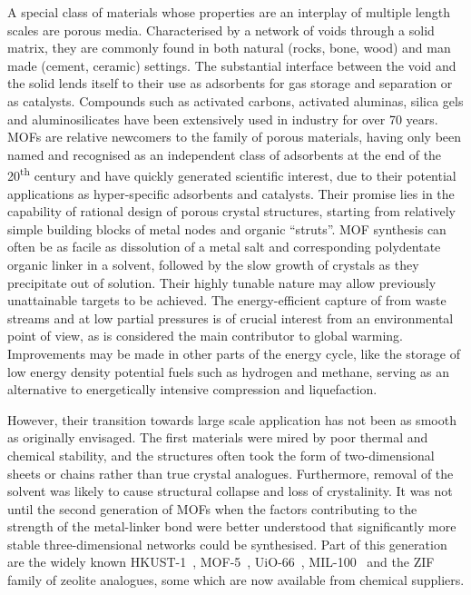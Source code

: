 A special class of materials whose properties are an interplay 
of multiple length scales are porous media. Characterised by
a network of voids through a solid matrix, they are 
commonly found in both natural (rocks, bone, wood) and man made 
(cement, ceramic) settings. The substantial interface between the
void and the solid lends itself to their use as adsorbents 
for gas storage and separation or as catalysts. Compounds such as 
activated carbons, activated aluminas, silica gels and aluminosilicates
have been extensively used in industry for over 70 years.
\glspl{MOF} are relative newcomers to the 
family of porous materials, having only been named and 
recognised as an independent class of adsorbents at the end of
the 20\textsuperscript{th} century and
have quickly generated scientific interest, due to their
potential applications as hyper-specific adsorbents and catalysts.
Their promise lies in the capability of rational design of 
porous crystal structures, starting from relatively simple building
blocks of metal nodes and organic ``struts''. \gls{MOF} synthesis can often
be as facile as dissolution of a metal salt and corresponding
polydentate organic linker in a solvent, followed by the slow 
growth of crystals as they precipitate out of solution.
Their highly tunable nature may allow previously unattainable
targets to be achieved. The energy-efficient capture of  from
waste streams and at low partial pressures is of crucial interest 
from an environmental point of view, as  is considered the 
main contributor to global warming. Improvements may be made in other parts 
of the energy cycle, like the storage of low energy density 
potential fuels such as hydrogen and methane, serving as an 
alternative to energetically intensive compression and liquefaction.

However, their transition towards large scale application has not been
as smooth as originally envisaged. The first materials
were mired by poor thermal and chemical stability, and the structures 
often took the form of two-dimensional sheets or chains rather than
true crystal analogues. Furthermore, removal of the solvent was likely
to cause structural collapse and loss of crystalinity. It was not until
the second generation of \glspl{MOF} when the factors contributing to the strength
of the metal-linker bond were better understood that significantly more stable 
three-dimensional networks could be synthesised.
Part of this generation are the widely known 
HKUST-1~\cite{chuiChemicallyFunctionalizableNanoporous1999}, 
MOF-5~\cite{rosiHydrogenStorageMicroporous2003},
UiO-66~\cite{cavkaNewZirconiumInorganic2008},
MIL-100~\cite{fereyChromiumTerephthalateBasedSolid2005}
and the ZIF~\cite{huangLigandDirectedStrategyZeoliteType2006} 
family of zeolite analogues, some which are now available from chemical
suppliers.


